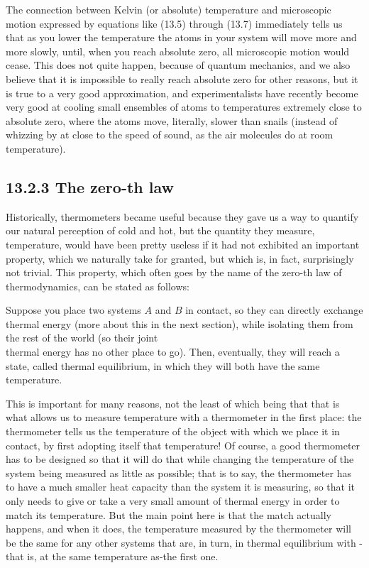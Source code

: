 \documentclass[10pt]{article}
\begin{document}
The connection between Kelvin (or absolute) temperature and microscopic motion expressed by equations like (13.5) through (13.7) immediately tells us that as you lower the temperature the atoms in your system will move more and more slowly, until, when you reach absolute zero, all microscopic motion would cease. This does not quite happen, because of quantum mechanics, and we also believe that it is impossible to really reach absolute zero for other reasons, but it is true to a very good approximation, and experimentalists have recently become very good at cooling small ensembles of atoms to temperatures extremely close to absolute zero, where the atoms move, literally, slower than snails (instead of whizzing by at close to the speed of sound, as the air molecules do at room temperature).

\subsection*{13.2.3 The zero-th law}
Historically, thermometers became useful because they gave us a way to quantify our natural perception of cold and hot, but the quantity they measure, temperature, would have been pretty useless if it had not exhibited an important property, which we naturally take for granted, but which is, in fact, surprisingly not trivial. This property, which often goes by the name of the zero-th law of thermodynamics, can be stated as follows:

Suppose you place two systems $A$ and $B$ in contact, so they can directly exchange thermal energy (more about this in the next section), while isolating them from the rest of the world (so their joint\\
thermal energy has no other place to go). Then, eventually, they will reach a state, called thermal equilibrium, in which they will both have the same temperature.

This is important for many reasons, not the least of which being that that is what allows us to measure temperature with a thermometer in the first place: the thermometer tells us the temperature of the object with which we place it in contact, by first adopting itself that temperature! Of course, a good thermometer has to be designed so that it will do that while changing the temperature of the system being measured as little as possible; that is to say, the thermometer has to have a much smaller heat capacity than the system it is measuring, so that it only needs to give or take a very small amount of thermal energy in order to match its temperature. But the main point here is that the match actually happens, and when it does, the temperature measured by the thermometer will be the same for any other systems that are, in turn, in thermal equilibrium with - that is, at the same temperature as-the first one.
\end{document}
